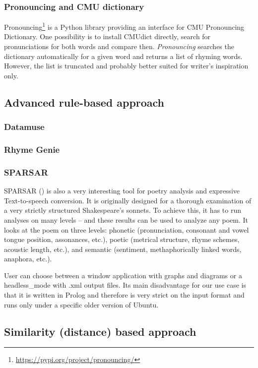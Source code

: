 \subsubsection*{Pronouncing and CMU dictionary}
Pronouncing\footnote{\url{https://pypi.org/project/pronouncing/}} is a Python library providing an interface for CMU Pronouncing Dictionary. One possibility is to install CMUdict directly, search for pronunciations for both words and compare then. \textit{Pronouncing} searches the dictionary automatically for a given word and returns a list of rhyming words. However, the list is truncated and probably better suited for writer's inspiration only.


\subsection{Advanced rule-based approach}
\subsubsection*{Datamuse}
\subsubsection*{Rhyme Genie}
\subsubsection*{SPARSAR}
SPARSAR (\cite{Delmonte2014}) is also a very interesting tool for poetry analysis and expressive Text-to-speech conversion. It is originally designed for a thorough examination of a very strictly structured Shakespeare's sonnets. To achieve this, it has to run analyses on many levels -- and these results can be used to analyze any poem. It looks at the poem on three levels: phonetic (pronunciation, consonant and vowel tongue position, assonances, etc.), poetic (metrical structure, rhyme schemes, acoustic length, etc.), and semantic (sentiment, methaphorically linked words, anaphora, etc.).

User can choose between a window application with graphs and diagrams or a \gls{headless_mode} with .xml output files. Its main disadvantage for our use case is that it is written in Prolog and therefore is very strict on the input format and runs only under a specific older version of Ubuntu. 

\subsection{Similarity (distance) based approach}
